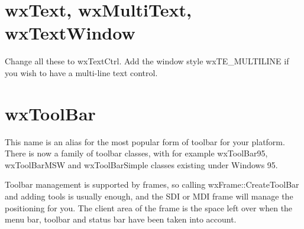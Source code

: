 \section{wxText, wxMultiText, wxTextWindow}

Change all these to wxTextCtrl. Add the window style wxTE\_MULTILINE if you
wish to have a multi-line text control.

\section{wxToolBar}

This name is an alias for the most popular form of toolbar for your platform. There is now a family
of toolbar classes, with for example wxToolBar95, wxToolBarMSW and wxToolBarSimple classes existing
under Windows 95.

Toolbar management is supported by frames, so calling wxFrame::CreateToolBar and adding tools is usually
enough, and the SDI or MDI frame will manage the positioning for you. The client area of the frame is the space
left over when the menu bar, toolbar and status bar have been taken into account.


